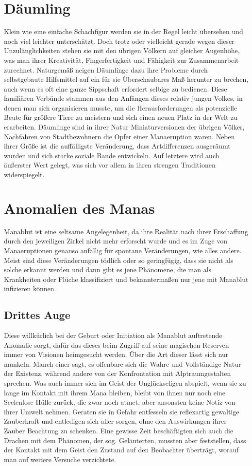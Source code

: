 \documentclass[a4paper,12pt,oneside]{book}
\begin{document}
\chapter{Däumling}
Klein wie eine einfache Schachfigur werden sie in der Regel leicht übersehen und noch viel leichter unterschätzt. Doch trotz oder vielleicht gerade wegen dieser Unzulänglichkeiten stehen sie mit den übrigen Völkern auf gleicher Augenhöhe, was man ihrer Kreativität, Fingerfertigkeit und Fähigkeit zur Zusammenarbeit zurechnet. Naturgemäß neigen Däumlinge dazu ihre Probleme durch selbstgebaute Hilfsmittel auf ein für sie Überschaubares Maß herunter zu brechen, auch wenn es oft eine ganze Sippschaft erfordert selbige zu bedienen. Diese familiären Verbünde stammen aus den Anfängen dieses relativ jungen Volkes, in denen man sich organisieren musste, um die Herausforderungen als potenzielle Beute für größere Tiere zu meistern und sich einen neuen Platz in der Welt zu erarbeiten. Däumlinge sind in ihrer Natur Miniaturversionen der übrigen Völker, Nachfahren von Stadtbewohnern die Opfer einer Manaeruption waren. Neben ihrer Größe ist die auffälligste Veränderung, dass Artdifferenzen ausgeräumt wurden und sich starke soziale Bande entwickeln. Auf letztere wird auch äußerster Wert gelegt, was sich vor allem in ihren strengen Traditionen widerspiegelt.

\chapter{Anomalien des Manas}
Manablut ist eine seltsame Angelegenheit, da ihre Realität nach ihrer Erschaffung durch den jeweiligen Zirkel nicht mehr erforscht wurde und es im Zuge von Manaeruptionen genauso anfällig für spontane Veränderungen, wie alles andere. Meist sind diese Veränderungen tödlich oder so geringfügig, dass sie nicht als solche erkannt werden und dann gibt es jene Phänomene, die man als Krankheiten oder Flüche klassifiziert und bekanntermaßen nur jene mit Manablut infizieren können.
\section{Drittes Auge}
Diese willkürlich bei der Geburt oder Initiation als Manablut auftretende Anomalie sorgt, dafür das dieses beim Zugriff auf seine magischen Reserven immer von Visionen heimgesucht werden. Über die Art dieser lässt sich nur munkeln. Manch einer sagt, es offenbare sich die Wahre und Vollständige Natur der Existenz, während andere von der Konfrontation mit Alptraumgestalten sprechen. Was auch immer sich im Geist der Unglückseligen abspielt, wenn sie zu lange im Kontakt mit ihrem Mana bleiben, bleibt von ihnen nur noch eine Seelenlose Hülle zurück, die zwar noch atmet, aber ansonsten keine Notiz von ihrer Umwelt nehmen. Geraten sie in Gefahr entfesseln sie reflexartig gewaltige Zauberkraft und entledigen sich aller sorgen, ohne den Auswirkungen ihrer Zauber Beachtung zu schenken. Eine gewisse Zeit beschäftigten sich auch die Drachen mit dem Phänomen, der sog. Geläuterten, mussten aber feststellen, dass der Kontakt mit dem Geist den Zustand auf den Beobachter überträgt, worauf man auf weitere Versuche verzichtete.
\end{document}
